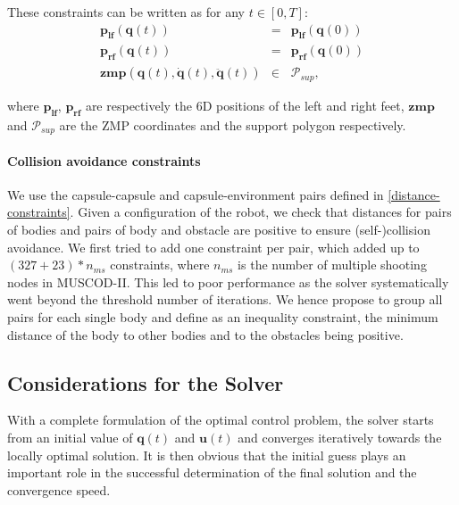 These constraints can be written as for any $t\in[0,T]$:
\begin{equation}
  \begin{array}{rcl}
    \mathbf{p_{lf}}(\mathbf{q}(t)) & = & \mathbf{p_{lf}}(\mathbf{q}(0)) \\
    \mathbf{p_{rf}}(\mathbf{q}(t)) & = & \mathbf{p_{rf}}(\mathbf{q}(0)) \\
    \mathbf{zmp} (\mathbf{q}(t), \mathbf{\dot{q}}(t), \mathbf{\ddot{q}}(t)) & \in & \mathcal{P}_{sup},
  \end{array}
  \label{dynamic-constraints}
\end{equation}

where $\mathbf{p_{lf}}$, $\mathbf{p_{rf}}$ are respectively the 6D
positions of the left and right feet, $\mathbf{zmp}$ and
$\mathcal{P}_{sup}$ are the ZMP coordinates and the support polygon
respectively.

\paragraph{Collision avoidance constraints}
We use the capsule-capsule and capsule-environment pairs defined in
\ref{distance-constraints}. Given a configuration \config{} of the
robot, we check that distances for pairs of bodies and pairs of body
and obstacle are positive to ensure (self-)collision avoidance. We
first tried to add one constraint per pair, which added up to $(327 +
23)*n_{ms}$ constraints, where $n_{ms}$ is the number of multiple
shooting nodes in \textsc{MUSCOD-II}. This led to poor performance as
the solver systematically went beyond the threshold number of
iterations. We hence propose to group all pairs for each single body
and define as an inequality constraint, the minimum distance of the
body to other bodies and to the obstacles being positive.

\subsection{Considerations for the Solver}
\label{initial-guess}
With a complete formulation of the optimal control problem, the solver
starts from an initial value of $\mathbf{q}(t)$ and $\mathbf{u}(t)$
and converges iteratively towards the locally optimal solution. It is
then obvious that the initial guess plays an important role in the
successful determination of the final solution and the convergence
speed.

